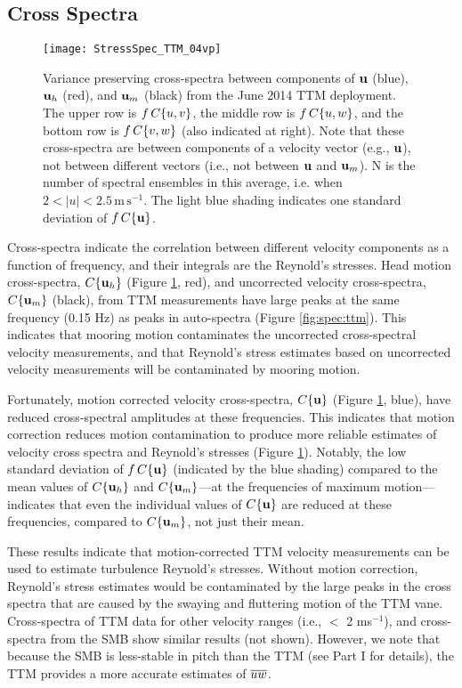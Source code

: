 \subsection{Cross Spectra}

\begin{figure}[t]
  \centering
  \texttt{[image: StressSpec\_TTM\_04vp]}
  \caption{Variance preserving cross-spectra between components of $\mathbf{u}$ (blue), $\mathbf{u}_{h}$ (red), and $\mathbf{u}_{m}$ (black) from the June 2014 TTM deployment. The upper row is $f\,C\{u,v\}$, the middle row is $f\,C\{u,w\}$, and the bottom row is $f\,C\{v,w\}$ (also indicated at right).  Note that these cross-spectra are between components of a velocity vector (e.g., $\mathbf{u}$), not between different vectors (i.e., not between $\mathbf{u}$ and $\mathbf{u}_{m}$). N is the number of spectral ensembles in this average, i.e. when $2 < |u| < 2.5\,\mathrm{m\,s^{-1}}$. The light blue shading indicates one standard deviation of $f\,C\{\mathbf{u}\}$.}
  \label{fig:cspec:ttm}
\end{figure}

Cross-spectra indicate the correlation between different velocity components as a function of frequency, and their integrals are the Reynold's stresses. Head motion cross-spectra, $C\{\mathbf{u}_{h}\}$ (Figure \ref{fig:cspec:ttm}, red), and uncorrected velocity cross-spectra, $C\lbrace \mathbf{u}_{m} \rbrace$ (black), from TTM measurements have large peaks at the same frequency (0.15 Hz) as peaks in auto-spectra (Figure \ref{fig:spec:ttm}).  This indicates that mooring motion contaminates the uncorrected cross-spectral velocity measurements, and that Reynold's stress estimates based on uncorrected velocity measurements will be contaminated by mooring motion. 

Fortunately, motion corrected velocity cross-spectra, $C\{\mathbf{u}\}$ (Figure \ref{fig:cspec:ttm}, blue), have reduced cross-spectral amplitudes at these frequencies. This indicates that motion correction reduces motion contamination to produce more reliable estimates of velocity cross spectra and Reynold's stresses (Figure \ref{fig:cspec:ttm}). Notably, the low standard deviation of $f\, C\{\mathbf{u}\}$ (indicated by the blue shading) compared to the mean values of $C\{\mathbf{u}_{h}\}$ and $C\{\mathbf{u}_{m}\}$---at the frequencies of maximum motion---indicates that even the individual values of $C\{\mathbf{u}\}$ are reduced at these frequencies, compared to $C\{\mathbf{u}_{m}\}$, not just their mean.

These results indicate that motion-corrected TTM velocity measurements can be used to estimate turbulence Reynold's stresses. Without motion correction, Reynold's stress estimates would be contaminated by the large peaks in the cross spectra that are caused by the swaying and fluttering motion of the TTM vane. Cross-spectra of TTM data for other velocity ranges (i.e., $<$ 2 ms$^{-1}$), and cross-spectra from the SMB show similar results (not shown). However, we note that because the SMB is less-stable in pitch than the TTM (see Part I for details), the TTM provides a more accurate estimates of  $\overline{uw}$.

